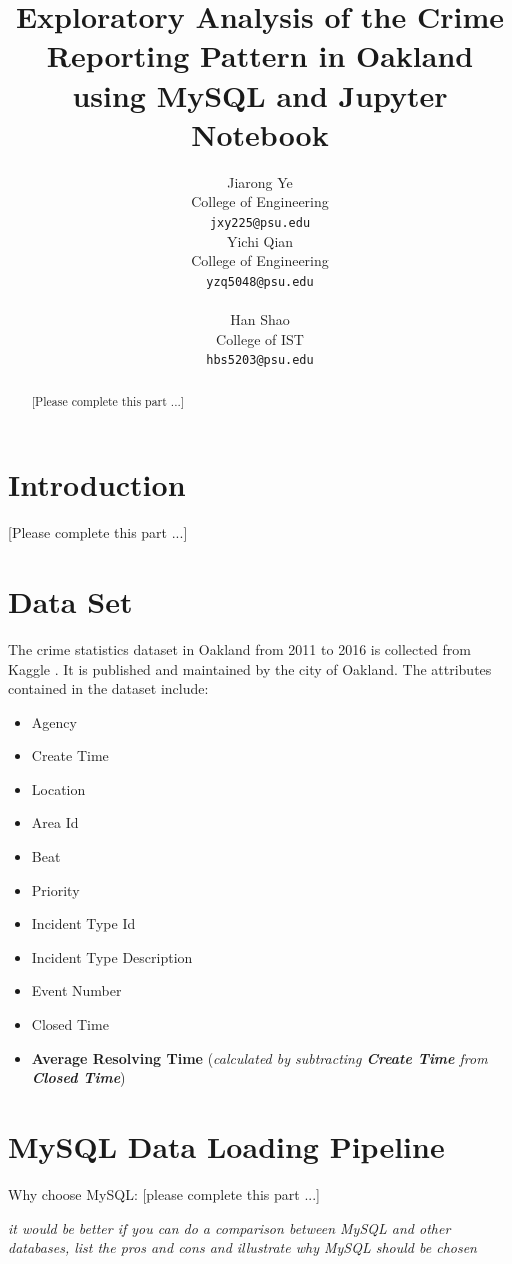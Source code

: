\documentclass{article} %
\title{Exploratory Analysis of the Crime Reporting Pattern in Oakland using MySQL and Jupyter Notebook}
\author{
	Jiarong Ye\\
	College of Engineering\\
	\texttt{jxy225@psu.edu} \\
	\And
	Yichi Qian\\
	College of Engineering\\
	\texttt{yzq5048@psu.edu} \\
	\\
	\And
	Han Shao\\
	College of IST \\
	\texttt{hbs5203@psu.edu} \\	
}
\begin{document}
\maketitle

\begin{abstract}

[Please complete this part ...]

\end{abstract}

\section{Introduction}

[Please complete this part ...]

\section{Data Set}


The crime statistics dataset in Oakland from 2011 to 2016 is collected from Kaggle \cite{kaggle}. It is published and maintained by the city of Oakland. 
The attributes contained in the dataset include:
\begin{itemize}
\item  Agency
\item  Create Time
\item  Location
\item  Area Id
\item  Beat
\item  Priority
\item  Incident Type Id
\item  Incident Type Description
\item  Event Number
\item  Closed Time
\item  \textbf{Average Resolving Time} (\textit{calculated by subtracting \textbf{Create Time} from \textbf{Closed Time}})

\end{itemize}


\section{MySQL Data Loading Pipeline}


Why choose MySQL: [please complete this part ...]

\textit{it would be better if you can do a comparison between MySQL and other databases, list the pros and cons and illustrate why MySQL should be chosen}
\end{document}
